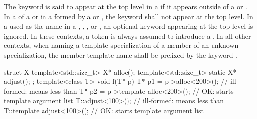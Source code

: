 \pnum
The keyword  is said to appear at the top level in
a 
if it appears outside of a  or
.
In a  of a  or
in a  formed by a  or
,
the keyword  shall not appear at the top level.
In a  used as the name in a
,
,
, or
,
an optional keyword  appearing at the top level is ignored.
In these contexts, a \tcode{<} token is always assumed to introduce a
.
In all other contexts, when naming a template specialization of
a member of an unknown specialization,
the member template name shall be prefixed by the keyword .
\begin{example}

\begin{codeblock}
struct X {
  template<std::size_t> X* alloc();
  template<std::size_t> static X* adjust();
};
template<class T> void f(T* p) {
  T* p1 = p->alloc<200>();              // ill-formed: \tcode{<} means less than
  T* p2 = p->template alloc<200>();     // OK: \tcode{<} starts template argument list
  T::adjust<100>();                     // ill-formed: \tcode{<} means less than
  T::template adjust<100>();            // OK: \tcode{<} starts template argument list
}
\end{codeblock}
\end{example}

